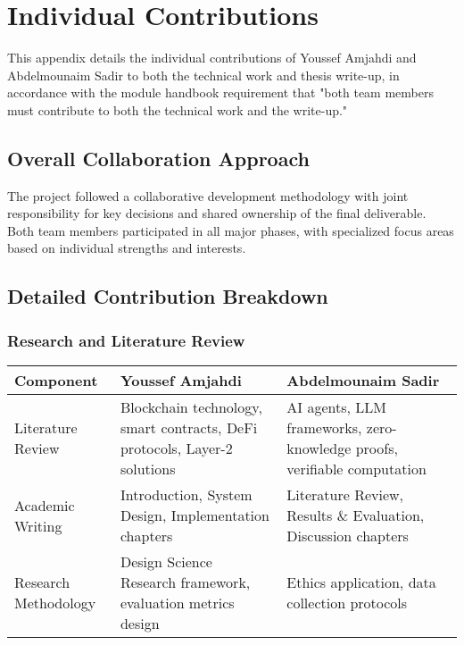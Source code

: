 \chapter{Individual Contributions}
\label{appendix:contributions}

This appendix details the individual contributions of Youssef Amjahdi and Abdelmounaim Sadir to both the technical work and thesis write-up, in accordance with the module handbook requirement that "both team members must contribute to both the technical work and the write-up."

\section{Overall Collaboration Approach}

The project followed a collaborative development methodology with joint responsibility for key decisions and shared ownership of the final deliverable. Both team members participated in all major phases, with specialized focus areas based on individual strengths and interests.

\section{Detailed Contribution Breakdown}

\subsection{Research and Literature Review}
\begin{longtable}{p{}p{}p{}}
\toprule
\textbf{Component} & \textbf{Youssef Amjahdi} & \textbf{Abdelmounaim Sadir} \\
\midrule
Literature Review & Blockchain technology, smart contracts, DeFi protocols, Layer-2 solutions & AI agents, LLM frameworks, zero-knowledge proofs, verifiable computation \\
Academic Writing & Introduction, System Design, Implementation chapters & Literature Review, Results \& Evaluation, Discussion chapters \\
Research Methodology & Design Science Research framework, evaluation metrics design & Ethics application, data collection protocols \\
\bottomrule
\end{longtable}

